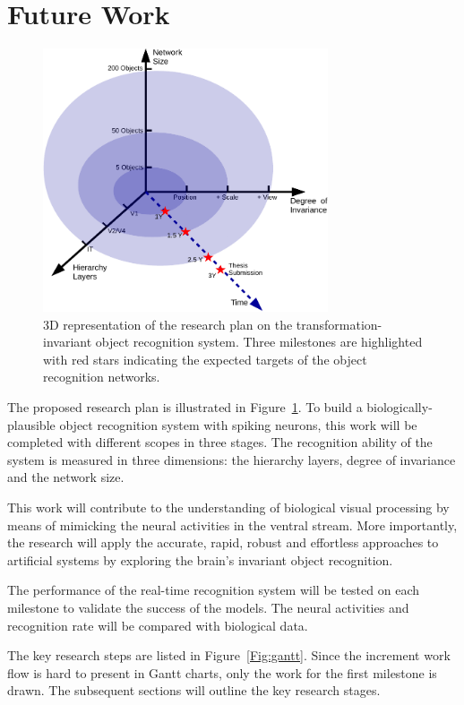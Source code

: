 \section{Future Work} 
\begin{figure}[h!]
	\centering
	\includegraphics[width=0.75\textwidth]{pics/3D_plan.pdf}
	\caption{3D representation of the research plan on the transformation-invariant object recognition system.
	Three milestones are highlighted with red stars indicating the expected targets of the object recognition networks.
	}
	\label{Fig:3Dplan}
\end{figure}
The proposed research plan is illustrated in Figure~\ref{Fig:3Dplan}.
To build a biologically-plausible object recognition system with spiking neurons, this work will be completed with different scopes in three stages.
The recognition ability of the system is measured in three dimensions: the hierarchy layers, degree of invariance and the network size.
 
This work will contribute to the understanding of biological visual processing by means of mimicking the neural activities in the ventral stream.
More importantly, the research will apply the accurate, rapid, robust and effortless approaches to artificial systems by exploring the brain's invariant object recognition.

The performance of the real-time recognition system will be tested on each milestone to validate the success of the models.
The neural activities and recognition rate will be compared with biological data.

The key research steps are listed in Figure~\ref{Fig:gantt}.
Since the increment work flow is hard to present in Gantt charts, only the work for the first milestone is drawn.
The subsequent sections will outline the key research stages.



